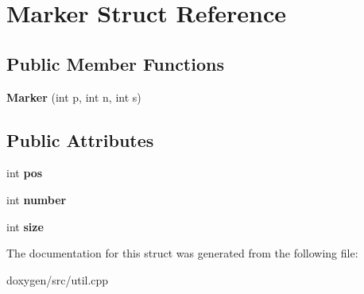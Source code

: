 \hypertarget{struct_marker}{}\section{Marker Struct Reference}
\label{struct_marker}
\subsection*{Public Member Functions}
\begin{DoxyCompactItemize}
\item 
\mbox{\label{struct_marker_a3c0c01909475e5924af4bb55f9c0d4b2}} 
{\bfseries Marker} (int p, int n, int s)
\end{DoxyCompactItemize}
\subsection*{Public Attributes}
\begin{DoxyCompactItemize}
\item 
\mbox{\label{struct_marker_af3b00061170c89e879eb98d2285d863f}} 
int {\bfseries pos}
\item 
\mbox{\label{struct_marker_a90e2cf96e8ae40c804bde2ed65d9d74d}} 
int {\bfseries number}
\item 
\mbox{\label{struct_marker_a2ca66237318915e4c73c690465d65503}} 
int {\bfseries size}
\end{DoxyCompactItemize}


The documentation for this struct was generated from the following file\+:\begin{DoxyCompactItemize}
\item 
doxygen/src/util.\+cpp\end{DoxyCompactItemize}
